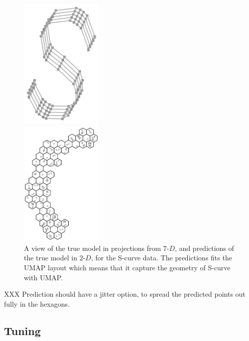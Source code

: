 \documentclass[
  12pt]{article}
\newcommand\gD{$2\text{-}D$}
\begin{document}
\begin{figure}[H]

\begin{minipage}{0.50\linewidth}
\begin{center}
\includegraphics[width=1.5625in,height=\textheight]{figures/scurve/sc_true_only.png}
\end{center}
\end{minipage}%
%
\begin{minipage}{0.50\linewidth}
\begin{center}
\includegraphics[width=1.5625in,height=\textheight]{figures/scurve/pred_true_view.png}
\end{center}
\end{minipage}%

\caption{\label{fig-scurve-pred-sc}A view of the true model in
projections from \(7\text{-}D\), and predictions of the true model in
\gD{}, for the S-curve data. The predictions fits the UMAP layout which
means that it capture the geometry of S-curve with UMAP.}

\end{figure}%

XXX Prediction should have a jitter option, to spread the predicted
points out fully in the hexagons.

\subsection{Tuning}\label{tuning}
\end{document}
